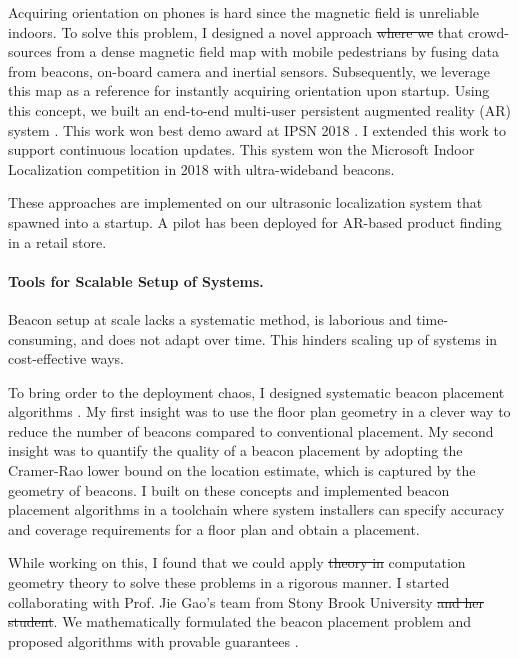 \documentclass[10pt]{article}
\begin{document}
Acquiring orientation on phones is hard since the magnetic field is unreliable indoors. To solve this problem, 
I designed a novel approach %
\st{where we}
that crowd-sources from a dense magnetic field map with mobile pedestrians by fusing data from beacons, on-board camera and inertial sensors. 
Subsequently, we leverage this map as a reference for instantly acquiring orientation upon startup. %
Using this concept, we built an end-to-end multi-user persistent augmented reality (AR) system \cite{mobileAR}. This work won best demo award at IPSN 2018 \cite{rajagopal2018welcome}. I extended this work to support continuous location updates. This system won the Microsoft Indoor Localization competition in 2018 with ultra-wideband beacons. 

These approaches are implemented on our ultrasonic localization system that spawned into a startup. A pilot has been deployed for AR-based product finding in a retail store. 

\paragraph{Tools for Scalable Setup of Systems.  }
Beacon setup at scale lacks a systematic method, is laborious and time-consuming, and does not adapt over time. This hinders scaling up of systems in cost-effective ways. %

To bring order to the deployment chaos, I designed systematic beacon
placement algorithms \cite{rajagopal2016beacon}.  My first insight was
to use the floor plan geometry in a clever way to reduce the number of
beacons compared to conventional placement.  My second insight was to
quantify the quality of a beacon placement by adopting the Cramer-Rao
lower bound on the location estimate, which is captured by the
geometry of beacons. I built on these concepts and implemented beacon
placement algorithms in a toolchain where system installers can
specify accuracy and coverage requirements for a floor plan and obtain
a placement.

While working on this, I found that we could apply \st{theory in}
computation geometry theory to solve these problems in a rigorous manner.  I
started collaborating with Prof. Jie Gao's team from Stony Brook University
\st{and her student}.  We mathematically formulated the beacon placement
problem and proposed algorithms with provable guarantees
\cite{beaconplacementtheory}.
\end{document}
